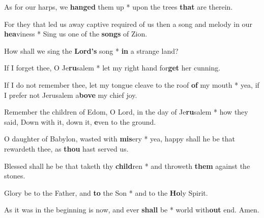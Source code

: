 \begin{multicols}{2}
	As for our harps, we \textbf{hanged} them up * upon the trees \textbf{that} are therein.
	
	For they that led us away captive required of us then a song and melody in our \textbf{hea}viness * Sing us one of the \textbf{songs} of Zion.
	
	How shall we sing the \textbf{Lord's} song * \textbf{in} a strange land?
	
	If I forget thee, O Je\textbf{ru}salem * let my right hand for\textbf{get} her cunning.
	
	If I do not remember thee, let my tongue cleave to the roof \textbf{of} my mouth * yea, if I prefer not Jerusalem a\textbf{bove} my chief joy.
	
	Remember the children of Edom, O Lord, in the day of Je\textbf{ru}salem * how they said, Down with it, down it, \textbf{e}ven to the ground.
	
	O daughter of Babylon, wasted with \textbf{mis}ery * yea, happy shall he be that rewardeth thee, as \textbf{thou} hast served us.
	
	Blessed shall he be that taketh thy \textbf{child}ren * and throweth \textbf{them} against the stones.
	
	Glory be to the Father, and \textbf{to} the Son * and to the \textbf{Ho}ly Spirit.
	
	As it was in the beginning is now, and ever \textbf{shall} be * world with\textbf{out} end. Amen.
\end{multicols}